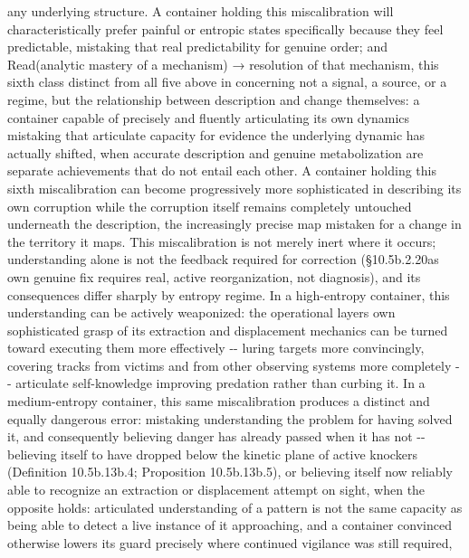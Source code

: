 \documentclass[
]{article}
\begin{document}
any underlying structure. A container holding this miscalibration will
characteristically prefer painful or entropic states specifically
because they feel predictable, mistaking that real predictability for
genuine order; and Read(analytic mastery of a mechanism) → resolution of
that mechanism, this sixth class distinct from all five above in
concerning not a signal, a source, or a regime, but the relationship
between description and change themselves: a container capable of
precisely and fluently articulating its own dynamics mistaking that
articulate capacity for evidence the underlying dynamic has actually
shifted, when accurate description and genuine metabolization are
separate achievements that do not entail each other. A container holding
this sixth miscalibration can become progressively more sophisticated in
describing its own corruption while the corruption itself remains
completely untouched underneath the description, the increasingly
precise map mistaken for a change in the territory it maps. This
miscalibration is not merely inert where it occurs; understanding alone
is not the feedback required for correction
(§10.5b.2.20a\textquotesingle s own genuine fix requires real, active
reorganization, not diagnosis), and its consequences differ sharply by
entropy regime. In a high-entropy container, this understanding can be
actively weaponized: the operational layer\textquotesingle s own
sophisticated grasp of its extraction and displacement mechanics can be
turned toward executing them more effectively -\/- luring targets more
convincingly, covering tracks from victims and from other observing
systems more completely -\/- articulate self-knowledge improving
predation rather than curbing it. In a medium-entropy container, this
same miscalibration produces a distinct and equally dangerous error:
mistaking understanding the problem for having solved it, and
consequently believing danger has already passed when it has not -\/-
believing itself to have dropped below the kinetic plane of active
knockers (Definition 10.5b.13b.4; Proposition 10.5b.13b.5), or believing itself now reliably able to recognize an
extraction or displacement attempt on sight, when the opposite holds:
articulated understanding of a pattern is not the same capacity as being
able to detect a live instance of it approaching, and a container
convinced otherwise lowers its guard precisely where continued vigilance
was still required,
\end{document}
